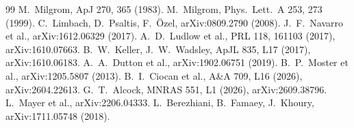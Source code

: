\documentclass[10pt]{article}
\begin{document}
\begin{thebibliography}{99}\small
{} M.~Milgrom, ApJ 270, 365 (1983).
 M.~Milgrom, Phys.\ Lett.\ A 253, 273 (1999).
 C.~Limbach, D.~Psaltis, F.~\"Ozel, arXiv:0809.2790 (2008).
 J.~F.~Navarro et al., arXiv:1612.06329 (2017).
 A.~D.~Ludlow et al., PRL 118, 161103 (2017), arXiv:1610.07663.
 B.~W.~Keller, J.~W.~Wadsley, ApJL 835, L17 (2017), arXiv:1610.06183.
 A.~A.~Dutton et al., arXiv:1902.06751 (2019).
 B.~P.~Moster et al., arXiv:1205.5807 (2013).
 B.~I.~Ciocan et al., A\&A 709, L16 (2026), arXiv:2604.22613.
 G.~T.~Alcock, MNRAS 551, L1 (2026), arXiv:2609.38796.
 L.~Mayer et al., arXiv:2206.04333.
 L.~Berezhiani, B.~Famaey, J.~Khoury, arXiv:1711.05748 (2018).
\end{thebibliography}
\end{document}
